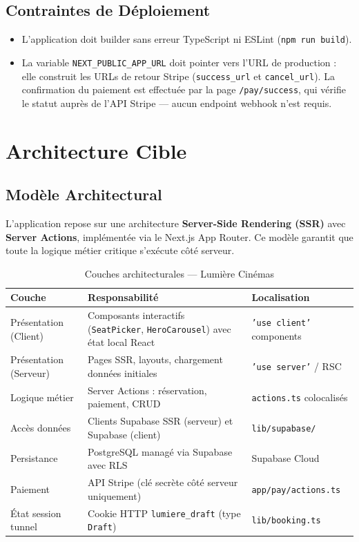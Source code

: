 \documentclass[12pt,a4paper,openany]{report}
\begin{document}
\section{Contraintes de Déploiement}

\begin{itemize}
  \item L'application doit builder sans erreur TypeScript ni ESLint (\texttt{npm run build}).
  \item La variable \texttt{NEXT\_PUBLIC\_APP\_URL} doit pointer vers l'URL de production : elle construit les URLs de retour Stripe (\texttt{success\_url} et \texttt{cancel\_url}). La confirmation du paiement est effectuée par la page \texttt{/pay/success}, qui vérifie le statut auprès de l'API Stripe — aucun endpoint webhook n'est requis.
\end{itemize}

\chapter{Architecture Cible}

\section{Modèle Architectural}

L'application repose sur une architecture \textbf{Server-Side Rendering (SSR)} avec \textbf{Server Actions}, implémentée via le Next.js App Router. Ce modèle garantit que toute la logique métier critique s'exécute côté serveur.

\begin{table}[H]
\centering
\begin{tabularx}{\textwidth}{lXl}
\toprule
\textbf{Couche} & \textbf{Responsabilité} & \textbf{Localisation} \\
\midrule
Présentation (Client)  & Composants interactifs (\texttt{SeatPicker}, \texttt{HeroCarousel}) avec état local React & \texttt{'use client'} components \\
Présentation (Serveur) & Pages SSR, layouts, chargement données initiales & \texttt{'use server'} / RSC \\
Logique métier         & Server Actions : réservation, paiement, CRUD & \texttt{actions.ts} colocalisés \\
Accès données          & Clients Supabase SSR (serveur) et Supabase (client) & \texttt{lib/supabase/} \\
Persistance            & PostgreSQL managé via Supabase avec RLS & Supabase Cloud \\
Paiement               & API Stripe (clé secrète côté serveur uniquement) & \texttt{app/pay/actions.ts} \\
État session tunnel    & Cookie HTTP \texttt{lumiere\_draft} (type \texttt{Draft}) & \texttt{lib/booking.ts} \\
\bottomrule
\end{tabularx}
\caption{Couches architecturales — Lumière Cinémas}
\end{table}
\end{document}
